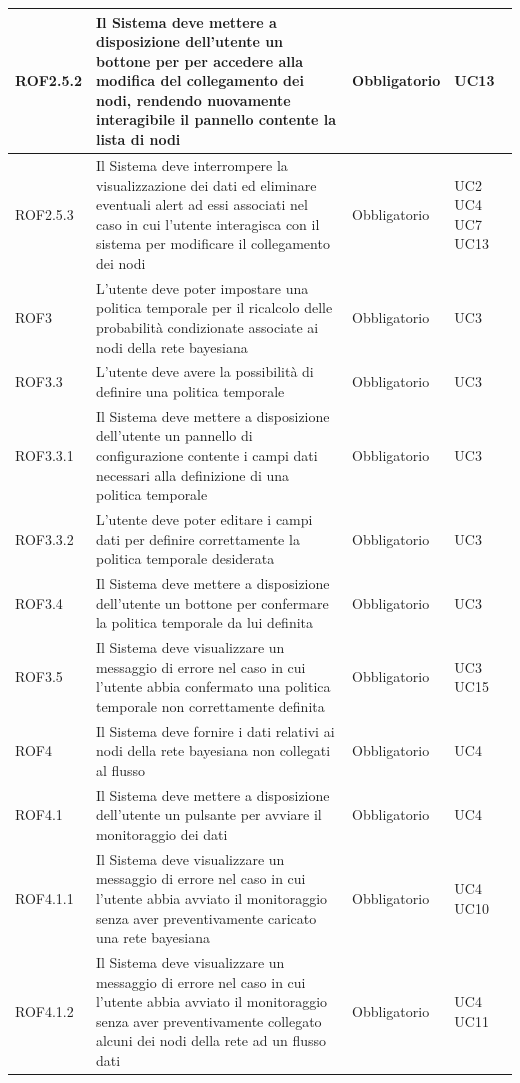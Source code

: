 \begin{center}
\begin{longtable}[c]{|m{}|m{}|m{}|m{}|}
\hline
\rowcolor{grigio}ROF2.5.2 & Il Sistema deve mettere a disposizione dell'utente un bottone per per accedere alla modifica del collegamento dei nodi, rendendo nuovamente interagibile il pannello contente la lista di nodi & Obbligatorio & UC13\\
\hline
ROF2.5.3 & Il Sistema deve interrompere la visualizzazione dei dati ed eliminare eventuali alert ad essi associati nel caso in cui l'utente interagisca con il sistema per modificare il collegamento dei nodi & Obbligatorio & UC2 UC4 UC7 UC13\\
\hline
\rowcolor{grigio}ROF3 & L'utente deve poter impostare una politica temporale per il ricalcolo delle probabilità condizionate associate ai nodi della rete bayesiana & Obbligatorio & UC3\\
\hline
ROF3.3 & L'utente deve avere la possibilità di definire una politica temporale & Obbligatorio & UC3\\ 
\hline
\rowcolor{grigio}ROF3.3.1 & Il Sistema deve mettere a disposizione dell'utente un pannello di configurazione contente i campi dati necessari alla definizione di una politica temporale & Obbligatorio & UC3\\
\hline
ROF3.3.2 & L'utente deve poter editare i campi dati per definire correttamente la politica temporale desiderata & Obbligatorio & UC3\\
\hline
\rowcolor{grigio}ROF3.4 & Il Sistema deve mettere a disposizione dell'utente un bottone per confermare la politica temporale da lui definita & Obbligatorio & UC3\\
\hline
ROF3.5 & Il Sistema deve visualizzare un messaggio di errore nel caso in cui l'utente abbia confermato una politica temporale non correttamente definita & Obbligatorio & UC3 UC15\\
\hline
\rowcolor{grigio}ROF4 & Il Sistema deve fornire i dati relativi ai nodi della rete bayesiana non collegati al flusso & Obbligatorio & UC4\\
\hline
ROF4.1 & Il Sistema deve mettere a disposizione dell'utente un pulsante per avviare il monitoraggio dei dati & Obbligatorio & UC4\\
\hline
\rowcolor{grigio}ROF4.1.1 & Il Sistema deve visualizzare un messaggio di errore nel caso in cui l'utente abbia avviato il monitoraggio senza aver preventivamente caricato una rete bayesiana & Obbligatorio & UC4 UC10\\
\hline
ROF4.1.2 & Il Sistema deve visualizzare un messaggio di errore nel caso in cui l'utente abbia avviato il monitoraggio senza aver preventivamente collegato alcuni dei nodi della rete ad un flusso dati & Obbligatorio & UC4 UC11\\

\end{longtable}
\end{center}

